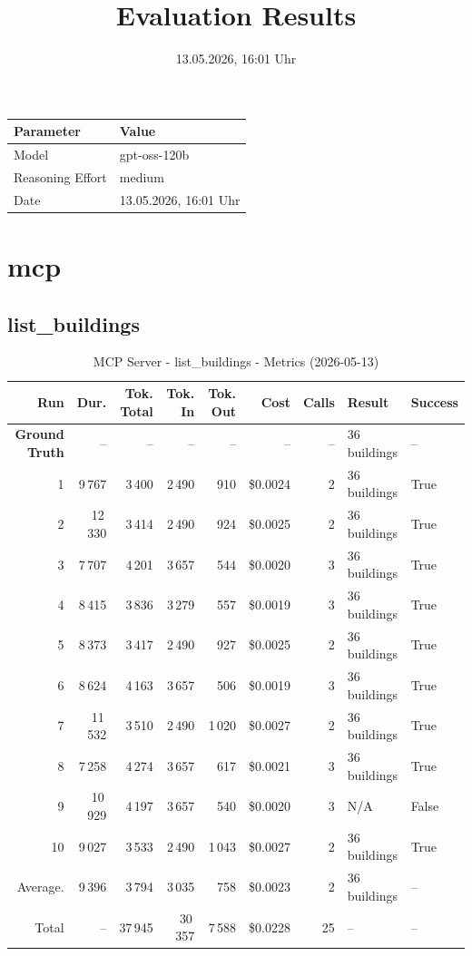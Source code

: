 \documentclass[a4paper,11pt]{article}
\title{Evaluation Results}
\date{13.05.2026, 16:01 Uhr}
\begin{document}
\maketitle

\begin{table}[H]
\centering
\begin{tabular}{l l}
\toprule
\textbf{Parameter} & \textbf{Value} \\
\midrule
Model & gpt-oss-120b \\
Reasoning Effort & medium \\
Date & 13.05.2026, 16:01 Uhr \\
\bottomrule
\end{tabular}
\end{table}

\tableofcontents
\clearpage

\section{mcp}

\subsection{list\_buildings}

\begin{table}[ht]
\centering
\scriptsize
\caption{MCP Server - list\_buildings - Metrics (2026-05-13)}
\label{tab:mcp\_list\_buildings\_metrics\_2026-05-13}
\begin{tabular}{r r r r r r r p{3cm} l}
\hline
Run & Dur. & Tok. Total & Tok. In & Tok. Out & Cost & Calls & Result & Success \\
\hline
\textbf{Ground Truth} & -- & -- & -- & -- & -- & -- & 36 buildings & -- \\
\hline
1 & 9\,767 & 3\,400 & 2\,490 & 910 & \$0.0024 & 2 & 36 buildings & True \\
2 & 12\,330 & 3\,414 & 2\,490 & 924 & \$0.0025 & 2 & 36 buildings & True \\
3 & 7\,707 & 4\,201 & 3\,657 & 544 & \$0.0020 & 3 & 36 buildings & True \\
4 & 8\,415 & 3\,836 & 3\,279 & 557 & \$0.0019 & 3 & 36 buildings & True \\
5 & 8\,373 & 3\,417 & 2\,490 & 927 & \$0.0025 & 2 & 36 buildings & True \\
6 & 8\,624 & 4\,163 & 3\,657 & 506 & \$0.0019 & 3 & 36 buildings & True \\
7 & 11\,532 & 3\,510 & 2\,490 & 1\,020 & \$0.0027 & 2 & 36 buildings & True \\
8 & 7\,258 & 4\,274 & 3\,657 & 617 & \$0.0021 & 3 & 36 buildings & True \\
9 & 10\,929 & 4\,197 & 3\,657 & 540 & \$0.0020 & 3 & N/A & False \\
10 & 9\,027 & 3\,533 & 2\,490 & 1\,043 & \$0.0027 & 2 & 36 buildings & True \\
\hline
Average. & 9\,396 & 3\,794 & 3\,035 & 758 & \$0.0023 & 2 & 36 buildings & -- \\
Total & -- & 37\,945 & 30\,357 & 7\,588 & \$0.0228 & 25 & -- & -- \\
\hline
\end{tabular}
\end{table}
\end{document}
